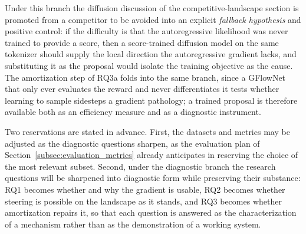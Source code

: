 \documentclass[11pt]{article}
\begin{document}
Under this branch the diffusion discussion of the competitive-landscape section is promoted from a competitor to be avoided into an explicit \emph{fallback hypothesis} and positive control: if the difficulty is that the autoregressive likelihood was never trained to provide a score, then a score-trained diffusion model on the same tokenizer should supply the local direction the autoregressive gradient lacks, and substituting it as the proposal would isolate the training objective as the cause. The amortization step of RQ3a folds into the same branch, since a GFlowNet that only ever evaluates the reward and never differentiates it tests whether learning to sample sidesteps a gradient pathology; a trained proposal is therefore available both as an efficiency measure and as a diagnostic instrument.

Two reservations are stated in advance. First, the datasets and metrics may be adjusted as the diagnostic questions sharpen, as the evaluation plan of Section~\ref{subsec:evaluation_metrics} already anticipates in reserving the choice of the most relevant subset. Second, under the diagnostic branch the research questions will be sharpened into diagnostic form while preserving their substance: RQ1 becomes whether and why the gradient is usable, RQ2 becomes whether steering is possible on the landscape as it stands, and RQ3 becomes whether amortization repairs it, so that each question is answered as the characterization of a mechanism rather than as the demonstration of a working system.



\end{document}
